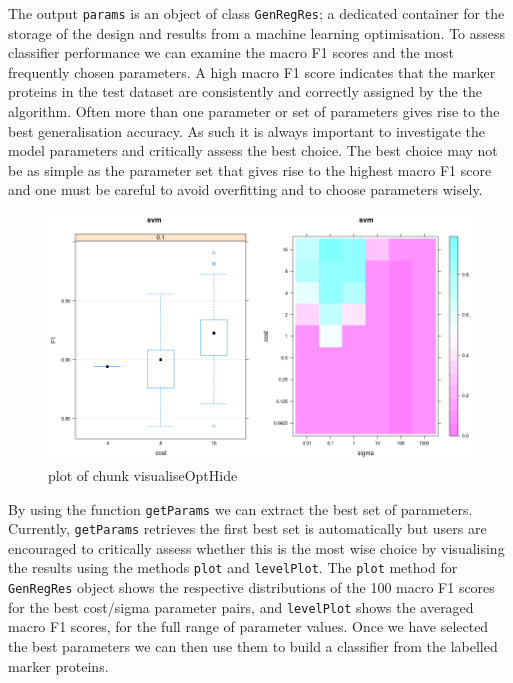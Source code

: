 The output \texttt{params} is an object of class \texttt{GenRegRes}; a
dedicated container for the storage of the design and results from a
machine learning optimisation. To assess classifier performance we can
examine the macro F1 scores and the most frequently chosen parameters. A
high macro F1 score indicates that the marker proteins in the test
dataset are consistently and correctly assigned by the the algorithm.
Often more than one parameter or set of parameters gives rise to the
best generalisation accuracy. As such it is always important to
investigate the model parameters and critically assess the best choice.
The best choice may not be as simple as the parameter set that gives
rise to the highest macro F1 score and one must be careful to avoid
overfitting and to choose parameters wisely.

\begin{Shaded}
\begin{Highlighting}[]
\StringTok{ }
\end{Highlighting}
\end{Shaded}

\begin{figure}[htbp]
\centering
\includegraphics{figure/visualiseOptHide-1.png}
\caption{plot of chunk visualiseOptHide}
\end{figure}

By using the function \texttt{getParams} we can extract the best set of
parameters. Currently, \texttt{getParams} retrieves the first best set
is automatically but users are encouraged to critically assess whether
this is the most wise choice by visualising the results using the
methods \texttt{plot} and \texttt{levelPlot}. The \texttt{plot} method
for \texttt{GenRegRes} object shows the respective distributions of the
100 macro F1 scores for the best cost/sigma parameter pairs, and
\texttt{levelPlot} shows the averaged macro F1 scores, for the full
range of parameter values. Once we have selected the best parameters we
can then use them to build a classifier from the labelled marker
proteins.

